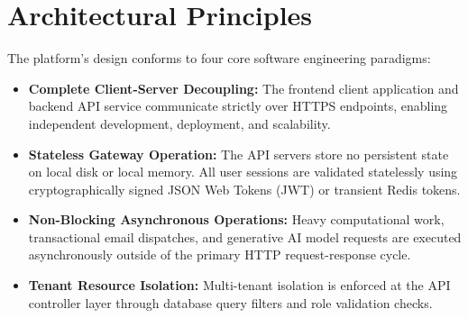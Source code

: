 \section{Architectural Principles}
The platform's design conforms to four core software engineering paradigms:
\begin{itemize}
    \item \textbf{Complete Client-Server Decoupling:} The frontend client application and backend API service communicate strictly over HTTPS endpoints, enabling independent development, deployment, and scalability.
    \item \textbf{Stateless Gateway Operation:} The API servers store no persistent state on local disk or local memory. All user sessions are validated statelessly using cryptographically signed JSON Web Tokens (JWT) or transient Redis tokens.
    \item \textbf{Non-Blocking Asynchronous Operations:} Heavy computational work, transactional email dispatches, and generative AI model requests are executed asynchronously outside of the primary HTTP request-response cycle.
    \item \textbf{Tenant Resource Isolation:} Multi-tenant isolation is enforced at the API controller layer through database query filters and role validation checks.
\end{itemize}

\pagebreak
